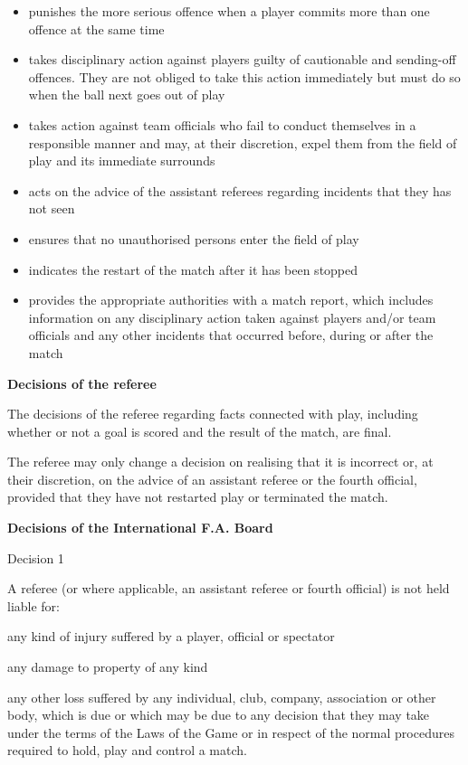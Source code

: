\begin{itemize}
\item punishes the more serious offence when a player commits more than one offence at the same time
\item takes disciplinary action against players guilty of cautionable and sending-off offences. They are not obliged to take this action immediately but must do so when the ball next goes out of play 
\item takes action against team officials who fail to conduct themselves in a responsible manner and may, at their discretion, expel them from the field of play and its immediate surrounds 
\item acts on the advice of the assistant referees regarding incidents that they has not seen 
\item ensures that no unauthorised persons enter the field of play 
\item indicates the restart of the match after it has been stopped 
\item provides the appropriate authorities with a match report, which includes information on any disciplinary action taken against players and/or team officials and any other incidents that occurred before, during or after
the match 
\end{itemize}

\bigskip

{\bfseries Decisions of the referee}

\headlinebox

The decisions of the referee regarding facts connected with play, including whether or not a goal is scored and the result of the match, are final.

\bigskip

The referee may only change a decision on realising that it is incorrect or, at their discretion, on the advice of an assistant referee or the fourth official, provided that they have not restarted play or terminated the match.


\clearpage
{\bfseries Decisions of the International F.A. Board }

\headlinebox

Decision 1

A referee (or where applicable, an assistant referee or fourth official) is not held liable for:

any kind of injury suffered by a player, official or spectator

any damage to property of any kind

any other loss suffered by any individual, club, company, association or other body, which is due or which may be due to any decision that they may take under the terms of the Laws of the Game or in respect of the normal procedures required to hold, play and control a match.

